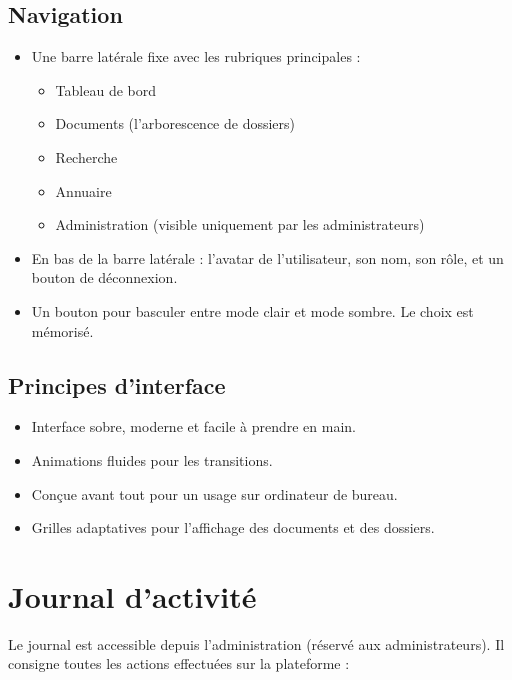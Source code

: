 \documentclass[a4paper,12pt,french]{article}
\begin{document}
\subsection{Navigation}

\begin{itemize}[leftmargin=1.5em]
  \item Une barre latérale fixe avec les rubriques principales :
    \begin{itemize}
      \item Tableau de bord
      \item Documents (l'arborescence de dossiers)
      \item Recherche
      \item Annuaire
      \item Administration (visible uniquement par les administrateurs)
    \end{itemize}
  \item En bas de la barre latérale : l'avatar de l'utilisateur, son nom, son rôle, et un bouton de déconnexion.
  \item Un bouton pour basculer entre mode clair et mode sombre. Le choix est mémorisé.
\end{itemize}

\subsection{Principes d'interface}

\begin{itemize}[leftmargin=1.5em]
  \item Interface sobre, moderne et facile à prendre en main.
  \item Animations fluides pour les transitions.
  \item Conçue avant tout pour un usage sur ordinateur de bureau.
  \item Grilles adaptatives pour l'affichage des documents et des dossiers.
\end{itemize}


\section{Journal d'activité}

Le journal est accessible depuis l'administration (réservé aux administrateurs). Il consigne toutes les actions effectuées sur la plateforme :
\end{document}
